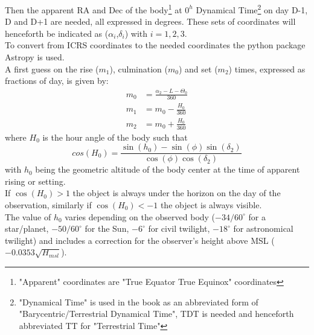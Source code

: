 \documentclass[a4paper]{article}
\begin{document}
\begin{multicols}{2}
		Then the apparent RA and Dec of the body\footnote{"Apparent" coordinates are "True Equator True Equinox" coordinates} at $0^h$ Dynamical Time\footnote{"Dynamical Time" is used in the book as an abbreviated form of "Barycentric/Terrestrial Dynamical Time", TDT is needed and henceforth abbreviated TT for "Terrestrial Time"} on day D-1, D and D+1 are needed, all expressed in degrees. These sets of coordinates will henceforth be indicated as ($\alpha_i$,$\delta_i$) with $i = 1,2,3$.\\
		To convert from ICRS coordinates to the needed coordinates the python package Astropy is used.\\
		
		A first guess on the rise ($m_1$), culmination ($m_0$) and set ($m_2$) times, expressed as fractions of day, is given by:
		\begin{align}
			m_0 &= \frac{\alpha_2 - L - \Theta_0}{360}\\
			m_1 &= m_0 - \frac{H_0}{360}\\
			m_2 &= m_0 + \frac{H_0}{360}
		\end{align}
		where $H_0$ is the hour angle of the body such that
		\begin{equation*}
			cos(H_0) = \frac{\sin(h_0)-\sin(\phi)\sin(\delta_2)}{\cos(\phi)\cos(\delta_2)}
		\end{equation*}
		with $h_0$ being the geometric altitude of the body center at the time of apparent rising or setting.\\
		If $\cos(H_0) > 1$ the object is always under the horizon on the day of the observation, similarly if $\cos(H_0) < -1$ the object is always visible.\\
		The value of $h_0$ varies depending on the observed body ($-34/60^{\circ}$ for a star/planet, $-50/60^{\circ}$ for the Sun, $-6^{\circ}$ for civil twilight, $-18^{\circ}$ for astronomical twilight) and includes a correction for the observer's height above MSL ($-0.0353\sqrt{H_{msl}}$).\\
		

\end{multicols}
\end{document}
